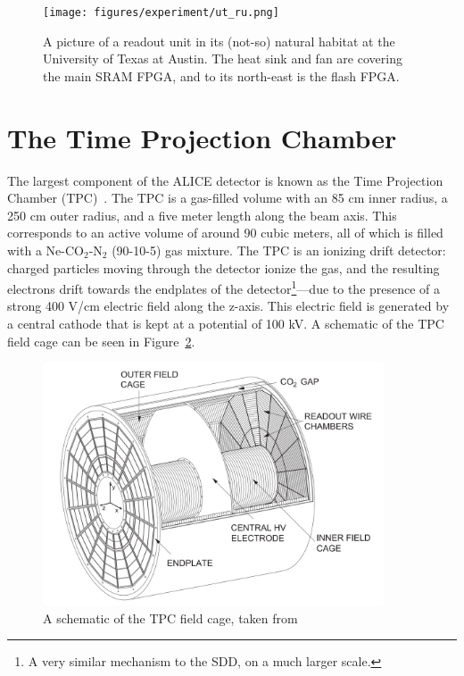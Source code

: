 \begin{figure}
    \centering
    \texttt{[image: figures/experiment/ut\_ru.png]}
    \caption{A picture of a readout unit in its (not-so) natural habitat at the University of Texas at Austin. The heat sink and fan are covering the main SRAM FPGA, and to its north-east is the flash FPGA.}
    \label{fig:ut_ru}
\end{figure}

\clearpage

\section{The Time Projection Chamber}
\label{sec:tpc}
The largest component of the ALICE detector is known as the Time Projection Chamber (TPC)~\cite{TPC1, TPC2}. The TPC is a gas-filled volume with an 85 cm inner radius, a 250 cm outer radius, and a five meter length along the beam axis. This corresponds to an active volume of around 90 cubic meters, all of which is filled with a Ne-CO$_2$-N$_2$ (90-10-5) gas mixture. The TPC is an ionizing drift detector: charged particles moving through the detector ionize the gas, and the resulting electrons drift towards the endplates of the detector\footnote{A very similar mechanism to the SDD, on a much larger scale.}---due to the presence of a strong 400 V/cm electric field along the z-axis. This electric field is generated by a central cathode that is kept at a potential of 100 kV. A schematic of the TPC field cage can be seen in Figure~\ref{fig:tpc_schematic}.

\begin{figure}
    \centering
    \includegraphics[width=0.9\textwidth]{figures/experiment/tpc_schematic.png}
    \caption{A schematic of the TPC field cage, taken from~\cite{TPC1}}
    \label{fig:tpc_schematic}
\end{figure}

